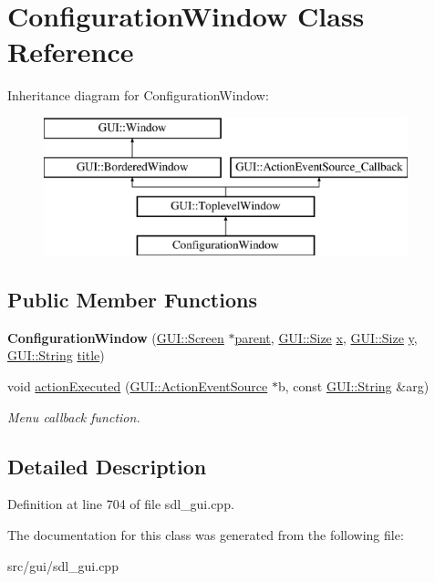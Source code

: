 \hypertarget{classConfigurationWindow}{\section{Configuration\-Window Class Reference}
\label{classConfigurationWindow}
}
Inheritance diagram for Configuration\-Window\-:\begin{figure}[H]
\begin{center}
\leavevmode
\includegraphics[height=4.000000cm]{classConfigurationWindow}
\end{center}
\end{figure}
\subsection*{Public Member Functions}
\begin{DoxyCompactItemize}
\item 
\hypertarget{classConfigurationWindow_aa024579e615b177a61410dc04b70d124}{{\bfseries Configuration\-Window} (\hyperlink{classGUI_1_1Screen}{G\-U\-I\-::\-Screen} $\ast$\hyperlink{classGUI_1_1Window_a2e593ff65e7702178d82fe9010a0b539}{parent}, \hyperlink{namespaceGUI_a10b6232e08729baa0bd211a86a69ce36}{G\-U\-I\-::\-Size} \hyperlink{classGUI_1_1Window_a6ca6a80ca00c9e1d8ceea8d3d99a657d}{x}, \hyperlink{namespaceGUI_a10b6232e08729baa0bd211a86a69ce36}{G\-U\-I\-::\-Size} \hyperlink{classGUI_1_1Window_a0ee8e923aff2c3661fc2e17656d37adf}{y}, \hyperlink{classGUI_1_1String}{G\-U\-I\-::\-String} \hyperlink{classGUI_1_1ToplevelWindow_a04de191f9a57b5b584657866a4ac6843}{title})}\label{classConfigurationWindow_aa024579e615b177a61410dc04b70d124}

\item 
\hypertarget{classConfigurationWindow_a2dac96be9ab39e51f0eabec372406664}{void \hyperlink{classConfigurationWindow_a2dac96be9ab39e51f0eabec372406664}{action\-Executed} (\hyperlink{classGUI_1_1ActionEventSource}{G\-U\-I\-::\-Action\-Event\-Source} $\ast$b, const \hyperlink{classGUI_1_1String}{G\-U\-I\-::\-String} \&arg)}\label{classConfigurationWindow_a2dac96be9ab39e51f0eabec372406664}

\begin{DoxyCompactList}\small\item\em Menu callback function. \end{DoxyCompactList}\end{DoxyCompactItemize}


\subsection{Detailed Description}


Definition at line 704 of file sdl\-\_\-gui.\-cpp.



The documentation for this class was generated from the following file\-:\begin{DoxyCompactItemize}
\item 
src/gui/sdl\-\_\-gui.\-cpp\end{DoxyCompactItemize}
